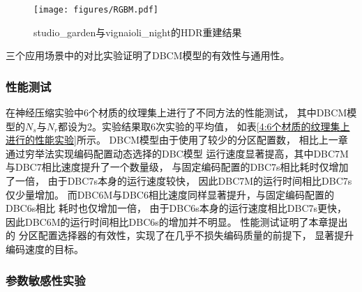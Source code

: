 \begin{figure*}[htbp]
    \centering
    \texttt{[image: figures/RGBM.pdf]}
    \caption{studio\_garden与vignaioli\_night的HDR重建结果}
    \label{fig:RGBM} 
\end{figure*}

三个应用场景中的对比实验证明了DBCM模型的有效性与通用性。

\subsubsection{性能测试}

在神经压缩实验中6个材质的纹理集上进行了不同方法的性能测试，
其中DBCM模型的$N_s$与$N_r$都设为2。实验结果取6次实验的平均值，
如表\ref{4:6个材质的纹理集上进行的性能实验}所示。
DBCM模型由于使用了较少的分区配置数，
相比上一章通过穷举法实现编码配置动态选择的DBC模型
运行速度显著提高，其中DBC7M与DBC7相比速度提升了一个数量级，
与固定编码配置的DBC7s相比耗时仅增加了一倍，
由于DBC7s本身的运行速度较快，
因此DBC7M的运行时间相比DBC7s仅少量增加。
而DBC6M与DBC6相比速度同样显著提升，与固定编码配置的DBC6s相比
耗时也仅增加一倍，
由于DBC6s本身的运行速度相比DBC7s更快，
因此DBC6M的运行时间相比DBC6s的增加并不明显。
性能测试证明了本章提出的
分区配置选择器的有效性，实现了在几乎不损失编码质量的前提下，
显著提升编码速度的目标。

\begin{table*}[htbp]
    \centering
    \caption{6个材质的纹理集上进行的性能测试结果}
    \label{4:6个材质的纹理集上进行的性能实验}        
\end{table*}

\subsubsection{参数敏感性实验}

